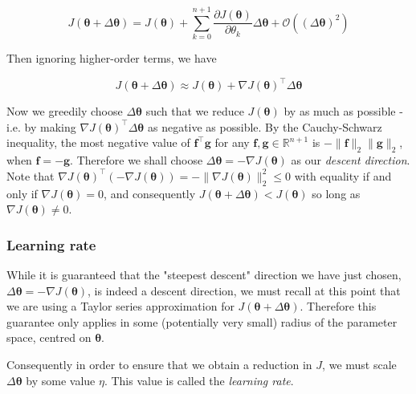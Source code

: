 \documentclass{article}[11pt]
\begin{document}
            $$
            J(\boldsymbol{\theta} + \Delta \boldsymbol{\theta}) = J(\boldsymbol{\theta}) + \sum_{k=0}^{n+1} \frac{\partial J(\boldsymbol{\theta})}{\partial \theta_k} \Delta \boldsymbol{\theta} + \mathcal{O} ((\Delta \boldsymbol{\theta})^2)
            $$
            
            Then ignoring higher-order terms, we have
            
            $$
            J(\boldsymbol{\theta} + \Delta \boldsymbol{\theta}) \approx J(\boldsymbol{\theta}) + \nabla J(\boldsymbol{\theta})^\top \Delta \boldsymbol{\theta}
            $$
            
            Now we greedily choose $\Delta \boldsymbol{\theta}$ such that we reduce $J(\boldsymbol{\theta})$ by as much as possible - i.e. by making $\nabla J(\boldsymbol{\theta})^\top \Delta \boldsymbol{\theta}$ as negative as possible. By the Cauchy-Schwarz inequality, the most negative value of $\mathbf{f}^\top \mathbf{g}$ for any $\mathbf{f}, \mathbf{g} \in \mathbb{R}^{n+1}$ is $- \lVert \mathbf{f} \rVert_2 \lVert \mathbf{g} \rVert_2$, when $\mathbf{f} = -\mathbf{g}$. Therefore we shall choose $\Delta \boldsymbol{\theta} = - \nabla J(\boldsymbol{\theta})$ as our \textit{descent direction}. Note that $\nabla J(\boldsymbol{\theta})^\top (- \nabla J(\boldsymbol{\theta})) = -\lVert \nabla J(\boldsymbol{\theta}) \rVert_2^2 \leq 0$ with equality if and only if $\nabla J(\boldsymbol{\theta}) = 0$, and consequently $J(\boldsymbol{\theta} + \Delta \boldsymbol{\theta}) < J(\boldsymbol{\theta})$ so long as $\nabla J(\boldsymbol{\theta}) \neq 0$.
        
    
    
        \subsubsection{Learning rate}
            
            While it is guaranteed that the "steepest descent" direction we have just chosen, $\Delta \boldsymbol{\theta} = - \nabla J(\boldsymbol{\theta})$, is indeed a descent direction, we must recall at this point that we are using a Taylor series approximation for $J(\boldsymbol{\theta} + \Delta \boldsymbol{\theta})$. Therefore this guarantee only applies in some (potentially very small) radius of the parameter space, centred on $\boldsymbol{\theta}$.
            
            Consequently in order to ensure that we obtain a reduction in $J$, we must scale $\Delta \boldsymbol{\theta}$ by some value $\eta$. This value is called the \textit{learning rate}.
            
\end{document}
